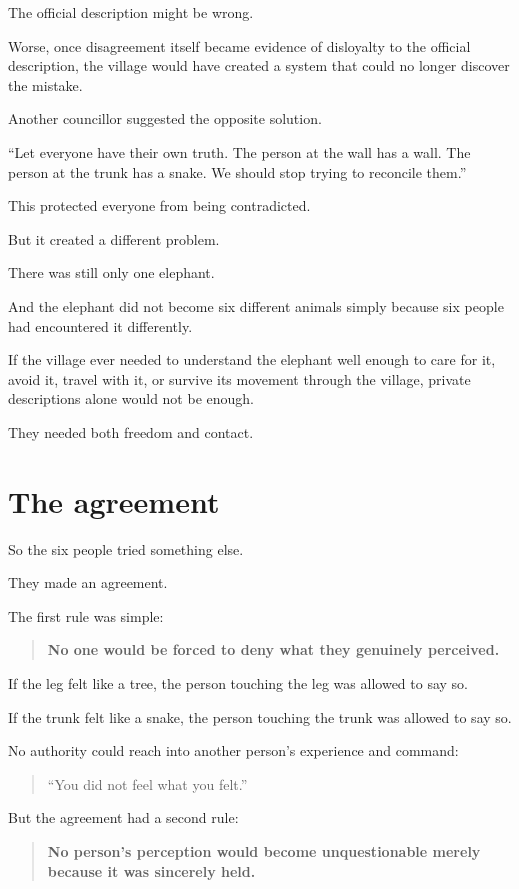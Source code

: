 \documentclass[11pt,a4paper]{article}
\begin{document}
The official description might be wrong.

Worse, once disagreement itself became evidence of disloyalty to the official description, the village would have created a system that could no longer discover the mistake.

Another councillor suggested the opposite solution.

``Let everyone have their own truth. The person at the wall has a wall. The person at the trunk has a snake. We should stop trying to reconcile them.''

This protected everyone from being contradicted.

But it created a different problem.

There was still only one elephant.

And the elephant did not become six different animals simply because six people had encountered it differently.

If the village ever needed to understand the elephant well enough to care for it, avoid it, travel with it, or survive its movement through the village, private descriptions alone would not be enough.

They needed both freedom and contact.

\section*{The agreement}

So the six people tried something else.

They made an agreement.

The first rule was simple:

\begin{quote}
\textbf{No one would be forced to deny what they genuinely perceived.}
\end{quote}

If the leg felt like a tree, the person touching the leg was allowed to say so.

If the trunk felt like a snake, the person touching the trunk was allowed to say so.

No authority could reach into another person's experience and command:

\begin{quote}
``You did not feel what you felt.''
\end{quote}

But the agreement had a second rule:

\begin{quote}
\textbf{No person's perception would become unquestionable merely because it was sincerely held.}
\end{quote}
\end{document}
